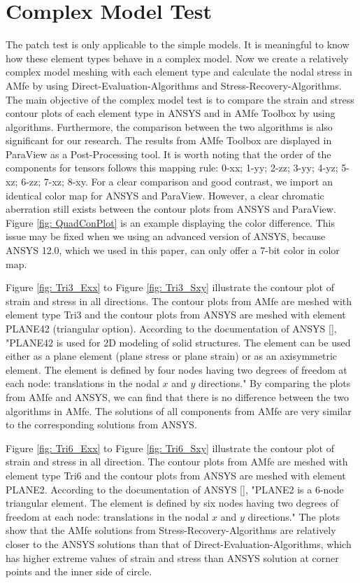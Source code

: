 \section{Complex Model Test}
The patch test is only applicable to the simple models. It is meaningful to know how these element types behave in a complex model. Now we create a relatively complex model meshing with each element type and calculate the nodal stress in AMfe by using Direct-Evaluation-Algorithms and Stress-Recovery-Algorithms. The main objective of the complex model test is to compare the strain and stress contour plots of each element type in ANSYS and in AMfe Toolbox by using algorithms. Furthermore, the comparison between the two algorithms is also significant for our research. The results from AMfe Toolbox are displayed in ParaView as a Post-Processing tool. It is worth noting that the order of the components for tensors follows this mapping rule: 0-xx; 1-yy; 2-zz;  3-yy; 4-yz; 5-xz; 6-zz; 7-xz; 8-xy. For a clear comparison and good contrast, we import an identical color map for ANSYS and ParaView. However, a clear chromatic aberration still exists between the contour plots from ANSYS and ParaView. Figure \ref{fig: QuadConPlot} is an example displaying the color difference. This issue may be fixed when we using an advanced version of ANSYS, because ANSYS 12.0, which we used in this paper, can only offer a 7-bit color in color map. 

Figure \ref{fig: Tri3_Exx} to Figure \ref{fig: Tri3_Sxy} illustrate the contour plot of strain and stress in all directions. The contour plots from AMfe are meshed with element type Tri3 and the contour plots from ANSYS are meshed with element PLANE42 (triangular option). According to the documentation of ANSYS [\cite{APDL}], "PLANE42 is used for 2D modeling of solid structures. The element can be used either as a plane element (plane stress or plane strain) or as an axisymmetric element. The element is defined by four nodes having two degrees of freedom at each node: translations in the nodal $x$ and $y$ directions."
By comparing the plots from AMfe and ANSYS, we can find that there is no difference between the two algorithms in AMfe. The solutions of all components from AMfe are very similar to the corresponding solutions from ANSYS. 

Figure \ref{fig: Tri6_Exx} to Figure \ref{fig: Tri6_Sxy} illustrate the contour plot of strain and stress in all direction. The contour plots from AMfe are meshed with element type Tri6 and the contour plots from ANSYS are meshed with element PLANE2. According to the documentation of ANSYS [\cite{APDL}], "PLANE2 is a 6-node triangular element. The element is defined by six nodes having two degrees of freedom at each node: translations in the nodal $x$ and $y$ directions." The plots show that the AMfe solutions from Stress-Recovery-Algorithms are relatively closer to the ANSYS solutions than that of Direct-Evaluation-Algorithms, which has higher extreme values of strain and stress than ANSYS solution at corner points and the inner side of circle. 

